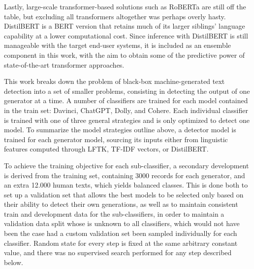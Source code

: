 Lastly, large-scale transformer-based solutions such as RoBERTa are still off the table, but excluding all transformers altogether was perhaps overly hasty.
DistilBERT \citep{sanh2020distilbertdistilledversionbert} is a BERT version that retains much of its larger siblings' language capability at a lower computational cost.
Since inference with DistilBERT is still manageable with the target end-user systems, it is included as an ensemble component in this work, with the aim to obtain some of the predictive power of state-of-the-art transformer approaches.

This work breaks down the problem of black-box machine-generated text detection into a set of smaller problems, consisting in detecting the output of one generator at a time.
A number of classifiers are trained for each model contained in the train set: Davinci, ChatGPT, Dolly, and Cohere.
Each individual classifier is trained with one of three general strategies and is only optimized to detect one model.
To summarize the model strategies outline above, a detector model is trained for each generator model, sourcing its inputs either from linguistic features computed through LFTK, TF-IDF vectors, or DistilBERT.

To achieve the training objective for each sub-classifier, a secondary development is derived from the training set, containing 3000 records for each generator, and an extra 12.000 human texts, which yields balanced classes.
This is done both to set up a validation set that allows the best models to be selected only based on their ability to detect their own generations, as well as to maintain consistent train and development data for the sub-classifiers, in order to maintain a validation data split whose is unknown to all classifiers, which would not have been the case had a custom validation set been sampled individually for each classifier. Random state for every step is fixed at the same arbitrary constant value, and there was no supervised search performed for any step described below.

